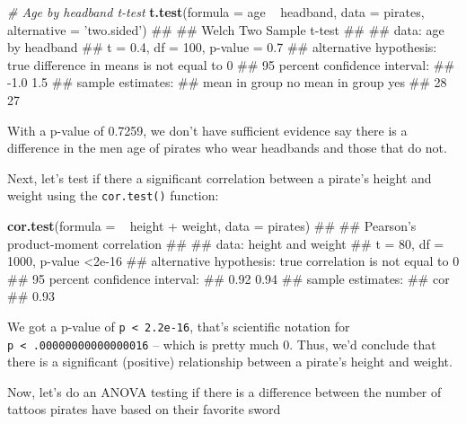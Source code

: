 \documentclass[]{book}
\newenvironment{Shaded}{\begin{snugshade}}{\end{snugshade}}
\newcommand{\KeywordTok}[1]{\textcolor[rgb]{0.13,0.29,0.53}{\textbf{{#1}}}}
\newcommand{\DataTypeTok}[1]{\textcolor[rgb]{0.13,0.29,0.53}{{#1}}}
\newcommand{\StringTok}[1]{\textcolor[rgb]{0.31,0.60,0.02}{{#1}}}
\newcommand{\CommentTok}[1]{\textcolor[rgb]{0.56,0.35,0.01}{\textit{{#1}}}}
\newcommand{\NormalTok}[1]{{#1}}
\theoremstyle{definition}
\theoremstyle{definition}
\theoremstyle{remark}
\begin{document}
\begin{Shaded}
\begin{Highlighting}[]
\CommentTok{# Age by headband t-test}
\KeywordTok{t.test}\NormalTok{(}\DataTypeTok{formula =} \NormalTok{age ~}\StringTok{ }\NormalTok{headband,}
       \DataTypeTok{data =} \NormalTok{pirates,}
       \DataTypeTok{alternative =} \StringTok{'two.sided'}\NormalTok{)}
\NormalTok{## }
\NormalTok{##  Welch Two Sample t-test}
\NormalTok{## }
\NormalTok{## data:  age by headband}
\NormalTok{## t = 0.4, df = 100, p-value = 0.7}
\NormalTok{## alternative hypothesis: true difference in means is not equal to 0}
\NormalTok{## 95 percent confidence interval:}
\NormalTok{##  -1.0  1.5}
\NormalTok{## sample estimates:}
\NormalTok{##  mean in group no mean in group yes }
\NormalTok{##                28                27}
\end{Highlighting}
\end{Shaded}

With a p-value of 0.7259, we don't have sufficient evidence say there is
a difference in the men age of pirates who wear headbands and those that
do not.

Next, let's test if there a significant correlation between a pirate's
height and weight using the \texttt{cor.test()} function:

\begin{Shaded}
\begin{Highlighting}[]
\KeywordTok{cor.test}\NormalTok{(}\DataTypeTok{formula =} \NormalTok{~}\StringTok{ }\NormalTok{height +}\StringTok{ }\NormalTok{weight,}
         \DataTypeTok{data =} \NormalTok{pirates)}
\NormalTok{## }
\NormalTok{##  Pearson's product-moment correlation}
\NormalTok{## }
\NormalTok{## data:  height and weight}
\NormalTok{## t = 80, df = 1000, p-value <2e-16}
\NormalTok{## alternative hypothesis: true correlation is not equal to 0}
\NormalTok{## 95 percent confidence interval:}
\NormalTok{##  0.92 0.94}
\NormalTok{## sample estimates:}
\NormalTok{##  cor }
\NormalTok{## 0.93}
\end{Highlighting}
\end{Shaded}

We got a p-value of \texttt{p\ \textless{}\ 2.2e-16}, that's scientific
notation for \texttt{p\ \textless{}\ .00000000000000016} -- which is
pretty much 0. Thus, we'd conclude that there is a significant
(positive) relationship between a pirate's height and weight.

Now, let's do an ANOVA testing if there is a difference between the
number of tattoos pirates have based on their favorite sword
\end{document}
